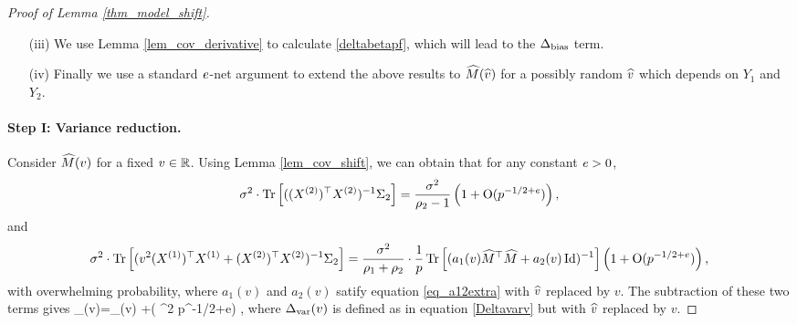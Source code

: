 \begin{proof}[Proof of Lemma \ref{thm_model_shift}]
\begin{itemize}
\item[(iii)] We use Lemma \ref{lem_cov_derivative} to calculate \eqref{deltabetapf}, which will lead to the $\Delta_{\text{bias}}$ term.

\item[(iv)] Finally we use a standard ${\mathit{e}}$-net argument to extend the above results to $\widehat M(\widehat v)$ for a possibly random $\widehat v$ which depends on $Y_1$ and $Y_2$.
\end{itemize}


\paragraph{Step I: Variance reduction.} Consider $\widehat M(v)$ for a fixed $v\in \mathbb{R}$. Using Lemma \ref{lem_cov_shift}, we can obtain that for any constant ${\mathit{e}}>0$,
$$  \sigma^2 \cdot \operatorname{Tr}\left[((X^{(2)})^{\top}X^{(2)})^{-1}\Sigma_2\right] = \frac{\sigma^2}{\rho_2-1}\left( 1+ \operatorname{O}(p^{-1/2+e})\right),$$
and
$$ \sigma^2 \cdot \operatorname{Tr}\left[( {v}^2 (X^{(1)})^{\top}X^{(1)} + (X^{(2)})^{\top}X^{(2)})^{-1} \Sigma_2\right] =   \frac {\sigma^2} {\rho_1 + \rho_2}\cdot \frac1p \operatorname{Tr}\left[( a_1(v) \widehat M^{\top}\widehat M + a_2(v)\operatorname{Id})^{-1}\right]\left( 1+ \operatorname{O}(p^{-1/2+e})\right) ,$$
with overwhelming probability, where $a_1(v)$ and $a_2(v)$ satify equation \eqref{eq_a12extra} with $\widehat v$ replaced by $v$. The subtraction of these two terms gives
\be\label{deltavaral-} \delta_{\vari}(v)=\Delta_{\vari}(v) +\OO( \sigma^2 p^{-1/2+e}) \quad {},
\ee
where $\Delta_{\text{var}}(v)$ is defined as in equation \eqref{Deltavarv} but with $\widehat v$ replaced by $v$.




\end{proof}
